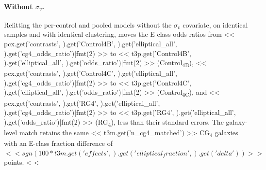 \documentclass{aa}
\newcommand{\CB}{Control\textsubscript{4B}}
\newcommand{\CC}{Control\textsubscript{4C}}
\newcommand{\CG}{CG\textsubscript{4}}
\newcommand{\RG}{RG\textsubscript{4}}
\newcommand{\kms}{\,\mathrm{km\,s}^{-1}}
\begin{document}
\begin{appendix}
\paragraph{Without \(\sigma_v\).} Refitting the per-control and pooled models without the \(\sigma_v\) covariate, on identical samples and with identical clustering, moves the E-class odds ratios from << pcx.get('contrasts', {}).get('Control4B', {}).get('elliptical_all', {}).get('cg4_odds_ratio')|fmt(2) >> to << t3p.get('Control4B', {}).get('elliptical_all', {}).get('odds_ratio')|fmt(2) >> (\CB{}), << pcx.get('contrasts', {}).get('Control4C', {}).get('elliptical_all', {}).get('cg4_odds_ratio')|fmt(2) >> to << t3p.get('Control4C', {}).get('elliptical_all', {}).get('odds_ratio')|fmt(2) >> (\CC{}), and << pcx.get('contrasts', {}).get('RG4', {}).get('elliptical_all', {}).get('cg4_odds_ratio')|fmt(2) >> to << t3p.get('RG4', {}).get('elliptical_all', {}).get('odds_ratio')|fmt(2) >> (\RG{}), less than their standard errors. The galaxy-level match retains the same << t3m.get('n_cg4_matched') >> \CG{} galaxies with an E-class fraction difference of \(<< sgn(100 * t3m.get('effects', {}).get('elliptical_fraction', {}).get('delta')) >>\) points. <%
<%


\end{appendix}
\end{document}
